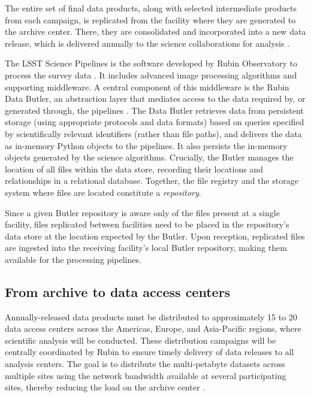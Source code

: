 \documentclass{webofc}
\begin{document}
The entire set of final data products, along with selected intermediate products from each campaign, is replicated from the facility where they are generated to the archive center. There, they are consolidated and incorporated into a new data release, which is delivered annually to the science collaborations for analysis \cite{10.1051_epjconf_202429501042}.

The LSST Science Pipelines is the software developed by Rubin Observatory to process the survey data \cite{bosch-pipelines}. It includes advanced image processing algorithms and supporting middleware. A central component of this middleware is the Rubin Data Butler, an abstraction layer that mediates access to the data required by, or generated through, the pipelines \cite{2022SPIE12189E..11J}. The Data Butler retrieves data from persistent storage (using appropriate protocols and data formats) based on queries specified by scientifically relevant identifiers (rather than file paths), and delivers the data as in-memory Python objects to the pipelines. It also persists the in-memory objects generated by the science algorithms. Crucially, the Butler manages the location of all files within the data store, recording their locations and relationships in a relational database. Together, the file registry and the storage system where files are located constitute a \emph{repository}.

Since a given Butler repository is aware only of the files present at a single facility, files replicated between facilities need to be placed in the repository's data store at the location expected by the Butler. Upon reception, replicated files are ingested into the receiving facility's local Butler repository, making them available for the processing pipelines.


\subsection{From archive to data access centers}
\label{summit-to-data-access-centers}

Annually-released data products must be distributed to approximately 15 to 20 data access centers across the Americas, Europe, and Asia-Pacific regions, where scientific analysis will be conducted. These distribution campaigns will be centrally coordinated by Rubin to ensure timely delivery of data releases to all analysis centers. The goal is to distribute the multi-petabyte datasets across multiple sites using the network bandwidth available at several participating sites, thereby reducing the load on the archive center \cite{RTN-086}.
\end{document}
